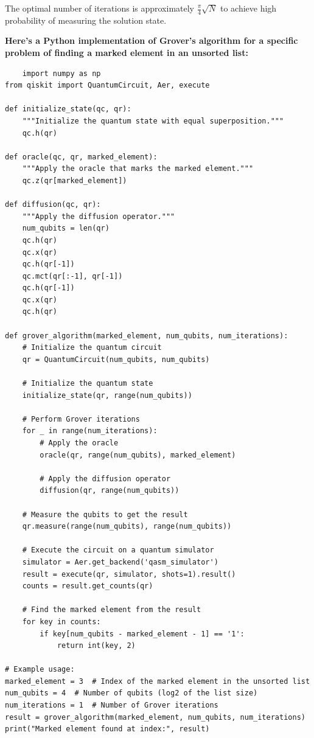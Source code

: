 \documentclass[12pt]{book} %
\begin{document}
The optimal number of iterations is approximately \(\frac{\pi}{4}\sqrt{N}\) to achieve high probability of measuring the solution state.

\textbf{Here's a Python implementation of Grover's algorithm for a specific problem of finding a marked element in an unsorted list:} 
\begin{lstlisting}
    import numpy as np
from qiskit import QuantumCircuit, Aer, execute

def initialize_state(qc, qr):
    """Initialize the quantum state with equal superposition."""
    qc.h(qr)

def oracle(qc, qr, marked_element):
    """Apply the oracle that marks the marked element."""
    qc.z(qr[marked_element])

def diffusion(qc, qr):
    """Apply the diffusion operator."""
    num_qubits = len(qr)
    qc.h(qr)
    qc.x(qr)
    qc.h(qr[-1])
    qc.mct(qr[:-1], qr[-1])
    qc.h(qr[-1])
    qc.x(qr)
    qc.h(qr)

def grover_algorithm(marked_element, num_qubits, num_iterations):
    # Initialize the quantum circuit
    qr = QuantumCircuit(num_qubits, num_qubits)
    
    # Initialize the quantum state
    initialize_state(qr, range(num_qubits))
    
    # Perform Grover iterations
    for _ in range(num_iterations):
        # Apply the oracle
        oracle(qr, range(num_qubits), marked_element)
        
        # Apply the diffusion operator
        diffusion(qr, range(num_qubits))
    
    # Measure the qubits to get the result
    qr.measure(range(num_qubits), range(num_qubits))
    
    # Execute the circuit on a quantum simulator
    simulator = Aer.get_backend('qasm_simulator')
    result = execute(qr, simulator, shots=1).result()
    counts = result.get_counts(qr)
    
    # Find the marked element from the result
    for key in counts:
        if key[num_qubits - marked_element - 1] == '1':
            return int(key, 2)

# Example usage:
marked_element = 3  # Index of the marked element in the unsorted list
num_qubits = 4  # Number of qubits (log2 of the list size)
num_iterations = 1  # Number of Grover iterations
result = grover_algorithm(marked_element, num_qubits, num_iterations)
print("Marked element found at index:", result)
\end{lstlisting}
\end{document}
